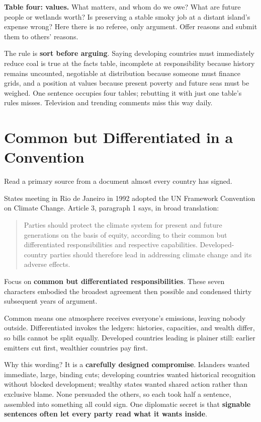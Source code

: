 \textbf{Table four: values.} What matters, and whom do we owe? What are future people or wetlands worth? Is preserving a stable smoky job at a distant island's expense wrong? Here there is no referee, only argument. Offer reasons and submit them to others' reasons.

The rule is \textbf{sort before arguing}. Saying developing countries must immediately reduce coal is true at the facts table, incomplete at responsibility because history remains uncounted, negotiable at distribution because someone must finance grids, and a position at values because present poverty and future seas must be weighed. One sentence occupies four tables; rebutting it with just one table's rules misses. Television and trending comments miss this way daily.

\section{Common but Differentiated in a Convention}
Read a primary source from a document almost every country has signed.

States meeting in Rio de Janeiro in 1992 adopted the UN Framework Convention on Climate Change. Article 3, paragraph 1 says, in broad translation:

\begin{quote}
Parties should protect the climate system for present and future generations on the basis of equity, according to their common but differentiated responsibilities and respective capabilities. Developed-country parties should therefore lead in addressing climate change and its adverse effects.
\end{quote}
Focus on \textbf{common but differentiated responsibilities}. These seven characters embodied the broadest agreement then possible and condensed thirty subsequent years of argument.

Common means one atmosphere receives everyone's emissions, leaving nobody outside. Differentiated invokes the ledgers: histories, capacities, and wealth differ, so bills cannot be split equally. Developed countries leading is plainer still: earlier emitters cut first, wealthier countries pay first.

Why this wording? It is a \textbf{carefully designed compromise}. Islanders wanted immediate, large, binding cuts; developing countries wanted historical recognition without blocked development; wealthy states wanted shared action rather than exclusive blame. None persuaded the others, so each took half a sentence, assembled into something all could sign. One diplomatic secret is that \textbf{signable sentences often let every party read what it wants inside}.

